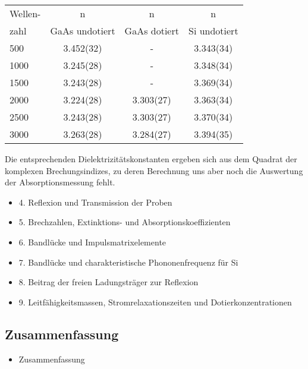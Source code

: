 \documentclass[paper=a4,fontsize=10pt,DIV=18,twocolumn,parskip=half]{scrartcl}
\numberwithin{equation}{section}    %
\begin{document}
\begin{tabular}{ l c c c }
  Wellen- & n & n&n\\
  zahl & GaAs undotiert & GaAs dotiert & Si undotiert \\
  500 & 3.452(32) & - & 3.343(34) \\
  1000 & 3.245(28) & - & 3.348(34) \\
  1500 & 3.243(28) & - & 3.369(34) \\
  2000 & 3.224(28) & 3.303(27) & 3.363(34) \\
  2500 & 3.243(28) & 3.303(27) & 3.370(34) \\
  3000 & 3.263(28) & 3.284(27) & 3.394(35) \\
\end{tabular}

Die entsprechenden Dielektrizitätskonstanten ergeben sich aus dem Quadrat der komplexen Brechungsindizes, 
zu deren Berechnung uns aber noch die Auswertung der Absorptionsmessung fehlt.

\begin{itemize}
\item 4. Reflexion und Transmission der Proben
\item 5. Brechzahlen, Extinktions- und Absorptionskoeffizienten
\item 6. Bandlücke und Impulsmatrixelemente
\item 7. Bandlücke und charakteristische Phononenfrequenz für Si
\item 8. Beitrag der freien Ladungsträger zur Reflexion
\item 9. Leitfähigkeitsmassen, Stromrelaxationszeiten und Dotierkonzentrationen
\end{itemize}


\subsection{Zusammenfassung}
\begin{itemize}
\item Zusammenfassung
\end{itemize}
\end{document}
